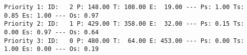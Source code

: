 \begin{lstlisting}[label={lst:results-persona3}, caption={Output for Martin Jensen.}, captionpos=b, language={}]
Priority 1: ID:   2 P: 148.00 T: 108.00 E:  19.00 --- Ps: 1.00 Ts: 0.85 Es: 1.00 --- Os: 0.97
Priority 2: ID:   1 P: 429.00 T: 358.00 E:  32.00 --- Ps: 0.15 Ts: 0.00 Es: 0.97 --- Os: 0.64
Priority 3: ID:   0 P: 480.00 T:  64.00 E: 453.00 --- Ps: 0.00 Ts: 1.00 Es: 0.00 --- Os: 0.19
\end{lstlisting}
